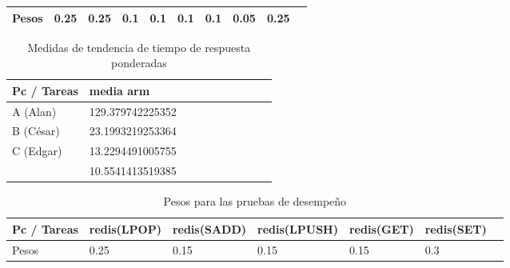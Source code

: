 \documentclass{article}
\begin{document}
\begin{enumerate}
{\begin{table}[]
\begin{tabular}{|l|l|l|l|l|l|l|l|l|l|}
                \cellcolor[HTML]{F8A102}{\color[HTML]{000000}} 
                Pesos & 0.25 & 0.25 & 0.1 & 0.1 & 0.1 & 0.1 & 0.05 & 0.25 \\ \hline

                \end{tabular}
            \end{table}

            \begin{table}[]
                \caption*{Medidas de tendencia de tiempo de respuesta ponderadas}
                \begin{tabular}{|l|l|l|l|l|l|l|l|l|l|}
                \toprule
                Pc / Tareas 
                & \cellcolor[HTML]{DAE8FC}media arm \\ \hline
    
                \cellcolor[HTML]{F8A102}{\color[HTML]{000000}} 
                A (Alan) & 129.379742225352 \\ \hline
    
                \cellcolor[HTML]{FFFE65}{\color[HTML]{000000}}
                B (César) & 23.1993219253364  \\ \hline
    
                \cellcolor[HTML]{34FF34}{\color[HTML]{000000}}
                C (Edgar) & 13.2294491005755 \\ \hline
    
                \cellcolor[HTML]{9698ED}{\color[HTML]{000000} 
                D(Sandra)} & 10.5541413519385 \\ \hline
    
                \end{tabular}
            \end{table}

            \begin{table}[]
                \caption*{Pesos para las pruebas de desempeño}
                \begin{tabular}{|l|l|l|l|l|l|l|}
                \toprule
                    Pc / Tareas 
                    & \cellcolor[HTML]{DAE8FC}redis(LPOP) 
                    & \cellcolor[HTML]{DAE8FC}redis(SADD) 
                    & \cellcolor[HTML]{DAE8FC}redis(LPUSH) 
                    & \cellcolor[HTML]{DAE8FC}redis(GET)
                    & \cellcolor[HTML]{DAE8FC}redis(SET) \\ \hline
    
                    \cellcolor[HTML]{F8A102}{\color[HTML]{000000}} 
                    Pesos & 0.25 & 0.15 & 0.15 & 0.15 & 0.3 \\ \hline


\end{tabular}
\end{table}}
\end{enumerate}
\end{document}
